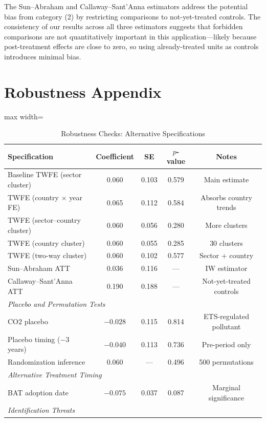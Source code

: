 \documentclass[12pt]{article}
\begin{document}
The Sun--Abraham and Callaway--Sant'Anna estimators address the potential bias from category (2) by restricting comparisons to not-yet-treated controls. The consistency of our results across all three estimators suggests that forbidden comparisons are not quantitatively important in this application---likely because post-treatment effects are close to zero, so using already-treated units as controls introduces minimal bias.


\section{Robustness Appendix}
\label{sec:rob_appendix}

\begin{table}[H]
\centering
\caption{Robustness Checks: Alternative Specifications}
\label{tab:robustness_summary}
\begin{adjustbox}{max width=\textwidth}
\begin{tabular}{lcccc}
\toprule
Specification & Coefficient & SE & $p$-value & Notes \\
\midrule
Baseline TWFE (sector cluster) & 0.060 & 0.103 & 0.579 & Main estimate \\
TWFE (country $\times$ year FE) & 0.065 & 0.112 & 0.584 & Absorbs country trends \\
TWFE (sector--country cluster) & 0.060 & 0.056 & 0.280 & More clusters \\
TWFE (country cluster) & 0.060 & 0.055 & 0.285 & 30 clusters \\
TWFE (two-way cluster) & 0.060 & 0.102 & 0.577 & Sector + country \\
Sun--Abraham ATT & 0.036 & 0.116 & --- & IW estimator \\
Callaway--Sant'Anna ATT & 0.190 & 0.188 & --- & Not-yet-treated controls \\
\midrule
\multicolumn{5}{l}{\emph{Placebo and Permutation Tests}} \\
CO2 placebo & $-0.028$ & 0.115 & 0.814 & ETS-regulated pollutant \\
Placebo timing ($-3$ years) & $-0.040$ & 0.113 & 0.736 & Pre-period only \\
Randomization inference & 0.060 & --- & 0.496 & 500 permutations \\
\midrule
\multicolumn{5}{l}{\emph{Alternative Treatment Timing}} \\
BAT adoption date & $-0.075$ & 0.037 & 0.087 & Marginal significance \\
\midrule
\multicolumn{5}{l}{\emph{Identification Threats}} \\

\end{tabular}
\end{adjustbox}
\end{table}
\end{document}
